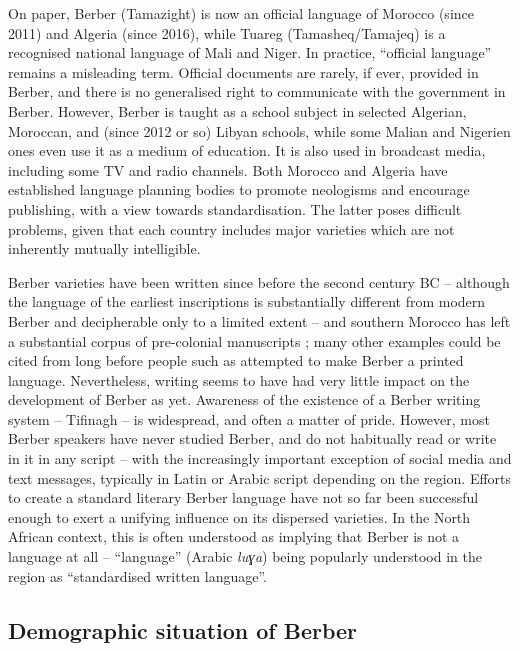 \documentclass[output=paper]{langsci/langscibook}
\begin{document}
On paper, Berber (Tamazight) is now an official language of Morocco (since 2011) and Algeria (since 2016), while Tuareg (Tamasheq/Tamajeq) is a recognised national language of Mali and Niger. In practice, “official language” remains a misleading term.  Official documents are rarely, if ever, provided in Berber, and there is no generalised right to communicate with the government in Berber.  However, Berber is taught as a school subject in selected Algerian, Moroccan, and (since 2012 or so) Libyan schools, while some Malian and Nigerien ones even use it as a medium of education. It is also used in broadcast media, including some TV and radio channels. Both Morocco and Algeria have established language planning bodies to promote neologisms and encourage publishing, with a view towards standardisation. The latter poses difficult problems, given that each country includes major varieties which are not inherently mutually intelligible.

Berber varieties have been written since before the second century BC \citep{Pichler2007} – although the language of the earliest inscriptions is substantially different from modern Berber and decipherable only to a limited extent – and southern Morocco has left a substantial corpus of pre-colonial manuscripts \citep{Boogert1997}; many other examples could be cited from long before people such as \citet{Mammeri1976} attempted to make Berber a printed language. Nevertheless, writing seems to have had very little impact on the development of Berber as yet. Awareness of the existence of a Berber writing system – Tifinagh – is widespread, and often a matter of pride. However, most Berber speakers have never studied Berber, and do not habitually read or write in it in any script – with the increasingly important exception of social media and text messages, typically in Latin or Arabic script depending on the region. Efforts to create a standard literary Berber language have not so far been successful enough to exert a unifying influence on its dispersed varieties. In the North African context, this is often understood as implying that Berber is not a language at all – “language” (Arabic \textit{luɣa}) being popularly understood in the region as “standardised written language”.


 
 \subsection{Demographic situation of Berber}
\end{document}

